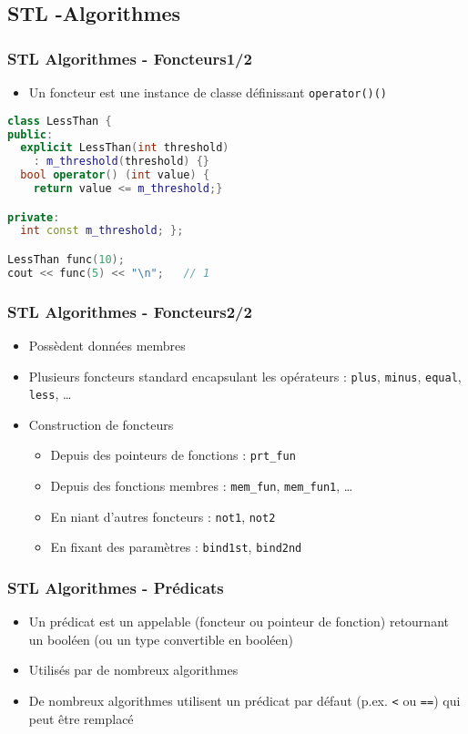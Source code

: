 \documentclass[C++.tex]{subfiles}
\begin{document}
\subsection*{STL -Algorithmes}
\begin{frame}[fragile]
	\frametitle{STL Algorithmes - Foncteurs\titlehfill{}1/2}
	\begin{itemize}
		\item Un foncteur est une instance de classe définissant \lstinline|operator()()|
	\end{itemize}

	\begin{lstlisting}[language=C++]
class LessThan {
public:
  explicit LessThan(int threshold)
    : m_threshold(threshold) {}
  bool operator() (int value) { 
    return value <= m_threshold;}

private:
  int const m_threshold; };

LessThan func(10);
cout << func(5) << "\n";   // 1\end{lstlisting}
\end{frame}

\begin{frame}
	\frametitle{STL Algorithmes - Foncteurs\titlehfill{}2/2}
	\begin{itemize}
		\item Possèdent données membres


		\item Plusieurs foncteurs standard encapsulant les opérateurs : \lstinline|plus|, \lstinline|minus|, \lstinline|equal|, \lstinline|less|, \ldots
		\item Construction de foncteurs
		\begin{itemize}
			\item Depuis des pointeurs de fonctions : \lstinline|prt_fun|
			\item Depuis des fonctions membres : \lstinline|mem_fun|, \lstinline|mem_fun1|, \ldots
			\item En niant d'autres foncteurs : \lstinline|not1|, \lstinline|not2|
			\item En fixant des paramètres : \lstinline|bind1st|, \lstinline|bind2nd|
		\end{itemize}
	\end{itemize}
\end{frame}

\begin{frame}
	\frametitle{STL Algorithmes - Prédicats}
	\begin{itemize}
		\item Un prédicat est un \og appelable\fg{} (foncteur ou pointeur de fonction) retournant un booléen (ou un type convertible en booléen)
		\item Utilisés par de nombreux algorithmes
		\item De nombreux algorithmes utilisent un prédicat par défaut (p.ex. \lstinline|<| ou \lstinline|==|) qui peut être remplacé
	\end{itemize}
\end{frame}
\end{document}
